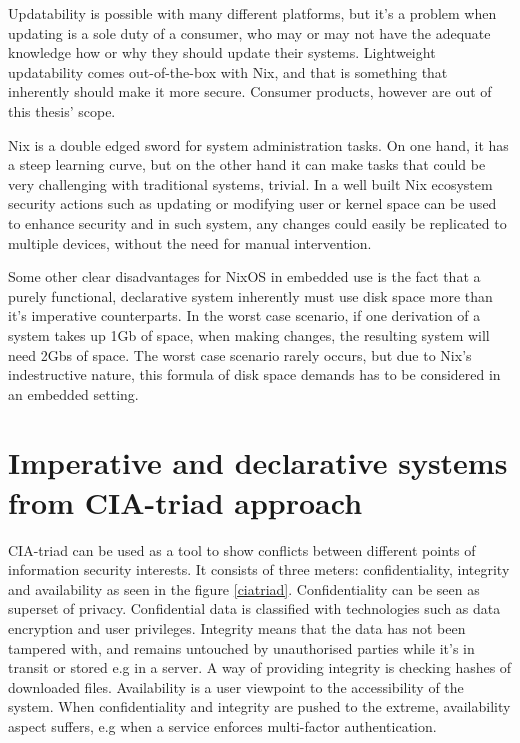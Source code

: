 Updatability is possible with many different platforms, but it's a
problem when updating is a sole duty of a consumer, who may or may not
have the adequate knowledge how or why they should update their
systems. Lightweight updatability comes out-of-the-box with Nix, and
that is something that inherently should make it more secure. Consumer
products, however are out of this thesis' scope.

Nix is a double edged sword for system administration tasks. On one
hand, it has a steep learning curve, but on the other hand it can make
tasks that could be very challenging with traditional systems,
trivial. In a well built Nix ecosystem security actions such as
updating or modifying user or kernel space can be used to enhance
security and in such system, any changes could easily be replicated to
multiple devices, without the need for manual intervention.

Some other clear disadvantages for NixOS in embedded use is the fact
that a purely functional, declarative system inherently must use disk
space more than it's imperative counterparts. In the worst case
scenario, if one derivation of a system takes up 1Gb of space, when
making changes, the resulting system will need 2Gbs of space. The
worst case scenario rarely occurs, but due to Nix's indestructive
nature, this formula of disk space demands has to be considered in an
embedded setting. \cite{dolstra2007purely}

\section{Imperative and declarative systems from CIA-triad approach} \label{imperativeanddeclarative}

CIA-triad can be used as a tool to show conflicts between different
points of information security interests. It consists of three meters:
confidentiality, integrity and availability as seen in the figure
\ref{ciatriad}. Confidentiality can be seen as superset of
privacy. Confidential data is classified with technologies such as
data encryption and user privileges. Integrity means that the data has
not been tampered with, and remains untouched by unauthorised parties
while it's in transit or stored e.g in a server. A way of providing
integrity is checking hashes of downloaded files. Availability is a
user viewpoint to the accessibility of the system. When
confidentiality and integrity are pushed to the extreme, availability
aspect suffers, e.g when a service enforces multi-factor
authentication. \cite{pender2019parkerian}


